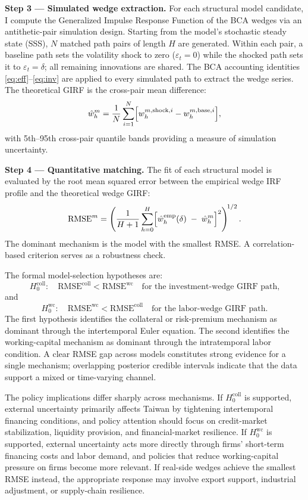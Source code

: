 \documentclass[12pt]{article}
\begin{document}
\textbf{Step 3 --- Simulated wedge extraction.}
For each structural model candidate, I compute the Generalized Impulse Response Function
\citep{koop1996impulse} of the BCA wedges via an antithetic-pair simulation design. Starting
from the model's stochastic steady state (SSS), $N$ matched path pairs of length $H$ are
generated. Within each pair, a baseline path sets the volatility shock to zero ($\varepsilon_t
= 0$) while the shocked path sets it to $\varepsilon_t = \delta$; all remaining innovations
are shared. The BCA accounting identities \eqref{eq:eff}--\eqref{eq:inv} are applied to every
simulated path to extract the wedge series. The theoretical GIRF is the cross-pair mean
difference:
\[
\hat{w}_{h}^{m}
=
\frac{1}{N}\sum_{i=1}^{N}
\Bigl[w_{h}^{m,\mathrm{shock},i} - w_{h}^{m,\mathrm{base},i}\Bigr],
\]
with 5th--95th cross-pair quantile bands providing a measure of simulation uncertainty.

\textbf{Step 4 --- Quantitative matching.}
The fit of each structural model is evaluated by the root mean squared error between the
empirical wedge IRF profile and the theoretical wedge GIRF:
\[
\mathrm{RMSE}^{m}
=
\left(
\frac{1}{H+1}
\sum_{h=0}^{H}
\Bigl[\hat{w}_{h}^{\mathrm{emp}}(\delta)\;-\;\hat{w}_{h}^{m}\Bigr]^{2}
\right)^{\!1/2}.
\]
The dominant mechanism is the model with the smallest RMSE. A correlation-based criterion
serves as a robustness check.

The formal model-selection hypotheses are:
\[
H_{0}^{\mathrm{coll}}:
\quad
\mathrm{RMSE}^{\mathrm{coll}} < \mathrm{RMSE}^{\mathrm{wc}}
\quad\text{for the investment-wedge GIRF path,}
\]
and
\[
H_{0}^{\mathrm{wc}}:
\quad
\mathrm{RMSE}^{\mathrm{wc}} < \mathrm{RMSE}^{\mathrm{coll}}
\quad\text{for the labor-wedge GIRF path.}
\]
The first hypothesis identifies the collateral or risk-premium mechanism as dominant through
the intertemporal Euler equation. The second identifies the working-capital mechanism as
dominant through the intratemporal labor condition. A clear RMSE gap across models constitutes
strong evidence for a single mechanism; overlapping posterior credible intervals indicate that
the data support a mixed or time-varying channel.

The policy implications differ sharply across mechanisms. If $H_{0}^{\mathrm{coll}}$ is
supported, external uncertainty primarily affects Taiwan by tightening intertemporal financing
conditions, and policy attention should focus on credit-market stabilization, liquidity
provision, and financial-market resilience. If $H_{0}^{\mathrm{wc}}$ is supported, external
uncertainty acts more directly through firms' short-term financing costs and labor demand, and
policies that reduce working-capital pressure on firms become more relevant. If real-side wedges
achieve the smallest RMSE instead, the appropriate response may involve export support,
industrial adjustment, or supply-chain resilience.
\end{document}
